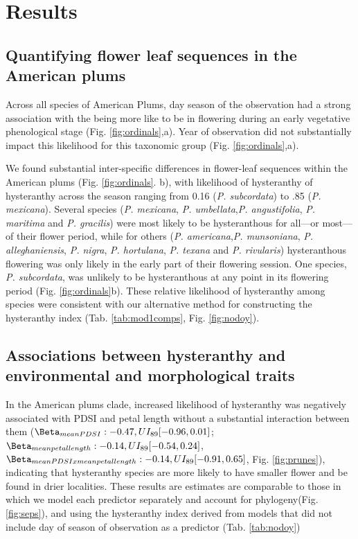 \documentclass{article}[12pt]
\begin{document}
\section*{Results}
\subsection*{Quantifying flower leaf sequences in the American plums}
Across all species of American Plums, day season of the observation had a strong association with the being more like to be in flowering during an early vegetative phenological stage (Fig. \ref{fig:ordinals},a). Year of observation did not substantially impact this likelihood for this taxonomic group (Fig. \ref{fig:ordinals},a).

We found substantial inter-specific differences in flower-leaf sequences within the American plums (Fig. \ref{fig:ordinals}. b), with likelihood of hysteranthy of hysteranthy across the season ranging from 0.16 (\emph{P. subcordata}) to .85 (\emph{P. mexicana}). Several species (\emph{P. mexicana}, \textit{P. umbellata},\textit{P. angustifolia}, \textit{P. maritima} and \textit{P. gracilis}) were most likely to be hysteranthous for all---or most---of their flower period, while for others (\textit{P. americana},\textit{P. munsoniana}, \textit{P. alleghaniensis}, \textit{P. nigra}, \textit{P. hortulana}, \textit{P. texana} and \textit{P. rivularis}) hysteranthous flowering was only likely in the early part of their flowering session. One species, \emph{P. subcordata}, was unlikely to be hysteranthous at any point in its flowering period (Fig. \ref{fig:ordinals}b). These relative likelihood of hysteranthy among species were consistent with our alternative method for constructing the hysteranthy index (Tab. \ref{tab:mod1comps}, Fig. \ref{fig:nodoy}).

\subsection*{Associations between hysteranthy and environmental and morphological traits}
In the American plums clade, increased likelihood of hysteranthy was negatively associated with PDSI and petal length  without a substantial interaction between them ($\Beta_{mean PDSI}: -0.47, UI_{89}[-0.96,0.01]$; $\Beta_{mean petal length}: -0.14,UI_{89}[ -0.54, 0.24]$, $\Beta_{mean PDSI x mean petal length}: -0.14,UI_{89}[ -0.91, 0.65]$,  Fig. \ref{fig:prunes}), indicating that hysteranthy species are more likely to have smaller flower and be found in drier localities. These results are estimates are comparable to those in which we model each predictor separately and account for phylogeny(Fig. \ref{fig:seps}), and using the hysteranthy index derived from models that did not include day of season of observation as a predictor (Tab. \ref{tab:nodoy})
\end{document}
